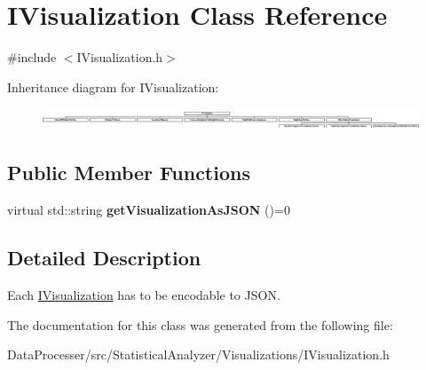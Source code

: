 \hypertarget{classIVisualization}{}\section{I\+Visualization Class Reference}
\label{classIVisualization}


{\ttfamily \#include $<$I\+Visualization.\+h$>$}

Inheritance diagram for I\+Visualization\+:\begin{figure}[H]
\begin{center}
\leavevmode
\includegraphics[height=0.636364cm]{classIVisualization}
\end{center}
\end{figure}
\subsection*{Public Member Functions}
\begin{DoxyCompactItemize}
\item 
\mbox{\label{classIVisualization_a425d9ec81e192e1264a2b716698449cb}} 
virtual std\+::string {\bfseries get\+Visualization\+As\+J\+S\+ON} ()=0
\end{DoxyCompactItemize}


\subsection{Detailed Description}
Each \hyperlink{classIVisualization}{I\+Visualization} has to be encodable to J\+S\+ON. 

The documentation for this class was generated from the following file\+:\begin{DoxyCompactItemize}
\item 
Data\+Processer/src/\+Statistical\+Analyzer/\+Visualizations/I\+Visualization.\+h\end{DoxyCompactItemize}
